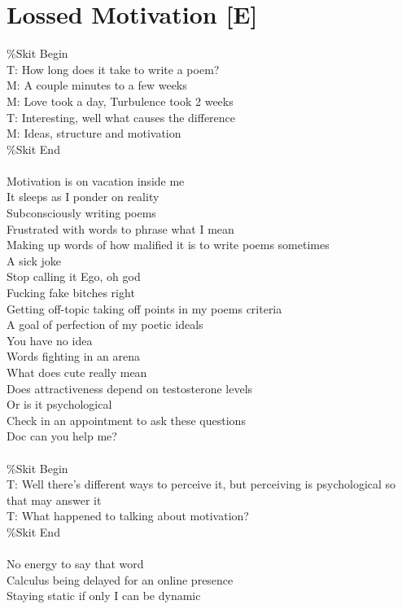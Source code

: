 \documentclass[12pt, b5paper, oneside]{book}
\begin{document}
\section{Lossed Motivation [E]}
\%Skit Begin
\\T: How long does it take to write a poem?
\\M: A couple minutes to a few weeks
\\M: Love took a day, Turbulence took 2 weeks
\\T: Interesting, well what causes the difference
\\M: Ideas, structure and motivation
\\\%Skit End
%
\\\\Motivation is on vacation inside me
\\It sleeps as I ponder on reality
\\Subconsciously writing poems
\\Frustrated with words to phrase what I mean
\\Making up words of how malified it is to write poems sometimes
\\A sick joke
\\Stop calling it Ego, oh god
\\Fucking fake bitches right
\\Getting off-topic taking off points in my poems criteria
\\A goal of perfection of my poetic ideals
\\You have no idea
\\Words fighting in an arena
\\What does cute really mean
\\Does attractiveness depend on testosterone levels
\\Or is it psychological
\\Check in an appointment to ask these questions
\\Doc can you help me?
%
\\\\\%Skit Begin
\\T: Well there's different ways to perceive it, but perceiving is psychological so that may answer it
\\T: What happened to talking about motivation?
\\\%Skit End
%
\\\\No energy to say that word
\\Calculus being delayed for an online presence
\\Staying static if only I can be dynamic
\end{document}
